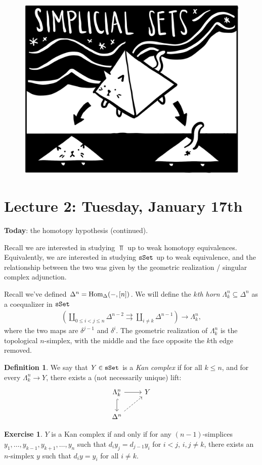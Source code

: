 \documentclass[12pt]{amsart}
\theoremstyle{definition}
\newtheorem{definition}[theorem]{Definition}
\newtheorem{exercise}[theorem]{Exercise}
\begin{document}
\begin{figure}[h]
  \includegraphics[width=0.5\linewidth]{pics/sset.jpg}
  \centering
 \end{figure}



\section{Lecture 2: Tuesday, January 17th}

\textbf{Today}: the homotopy hypothesis (continued).

Recall we are interested in studying $\Top$ up to weak homotopy equivalences. Equivalently, we are interested in studying $\texttt{sSet}$ up to weak equivalence, and the relationship between the two was given by the geometric realization / singular complex adjunction.

Recall we've defined $\Delta^n = \text{Hom}_\Delta(-,[n])$. We will define the $k$\textit{th horn} $\Lambda^n_k \subseteq \Delta^n$ as a coequalizer in $\texttt{sSet}$
\begin{align*}
    \left(\coprod_{0 \le i < j \le n} \Delta^{n-2} \rightrightarrows \coprod_{i\ne k} \Delta^{n-1} \right) \to \Lambda^n_k,
\end{align*}
where the two maps are $\delta^{j-1}$ and $\delta^i$. The geometric realization of $\Lambda^n_k$ is the topological $n$-simplex, with the middle and the face opposite the $k$th edge removed.

\begin{definition} We say that $Y\in \texttt{sSet}$ is a \textit{Kan complex} if for all $k\le n$, and for every $\Lambda^n_k \to Y$, there exists a (not necessarily unique) lift:
\[ \begin{tikzcd}
    \Lambda^n_k\dar[hook]\rar & Y\\
    \Delta^n\ar[ur,dashed] & 
\end{tikzcd} \]
\end{definition}

\begin{exercise} $Y$ is a Kan complex if and only if for any $(n-1)$-simplices $y_1, \ldots, y_{k-1},y_{k+1}, \ldots, y_n$ such that $d_i y_j = d_{j-1} y_i$ for $i< j$, $i,j\ne k$, there exists an $n$-simplex $y$ such that $d_i y = y_i$ for all $i\ne k$.
\end{exercise}
\end{document}
